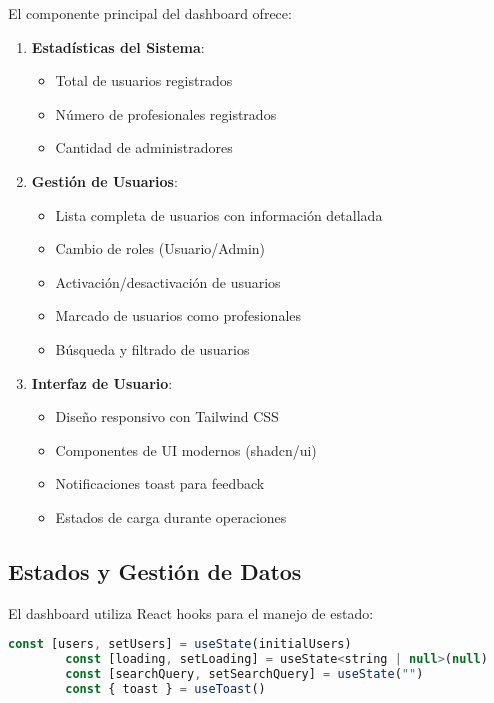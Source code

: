 \documentclass[12pt,a4paper]{article}
\begin{document}
	El componente principal del dashboard ofrece:
	
	\begin{enumerate}
		\item \textbf{Estadísticas del Sistema}:
		\begin{itemize}
			\item Total de usuarios registrados
			\item Número de profesionales registrados
			\item Cantidad de administradores
		\end{itemize}
		
		\item \textbf{Gestión de Usuarios}:
		\begin{itemize}
			\item Lista completa de usuarios con información detallada
			\item Cambio de roles (Usuario/Admin)
			\item Activación/desactivación de usuarios
			\item Marcado de usuarios como profesionales
			\item Búsqueda y filtrado de usuarios
		\end{itemize}
		
		\item \textbf{Interfaz de Usuario}:
		\begin{itemize}
			\item Diseño responsivo con Tailwind CSS
			\item Componentes de UI modernos (shadcn/ui)
			\item Notificaciones toast para feedback
			\item Estados de carga durante operaciones
		\end{itemize}
	\end{enumerate}
	
	\subsection{Estados y Gestión de Datos}
	
	El dashboard utiliza React hooks para el manejo de estado:
	
	\begin{lstlisting}[language=JavaScript, caption=Estados del componente AdminDashboard]
		const [users, setUsers] = useState(initialUsers)
		const [loading, setLoading] = useState<string | null>(null)
		const [searchQuery, setSearchQuery] = useState("")
		const { toast } = useToast()
	\end{lstlisting}
	
\end{document}
